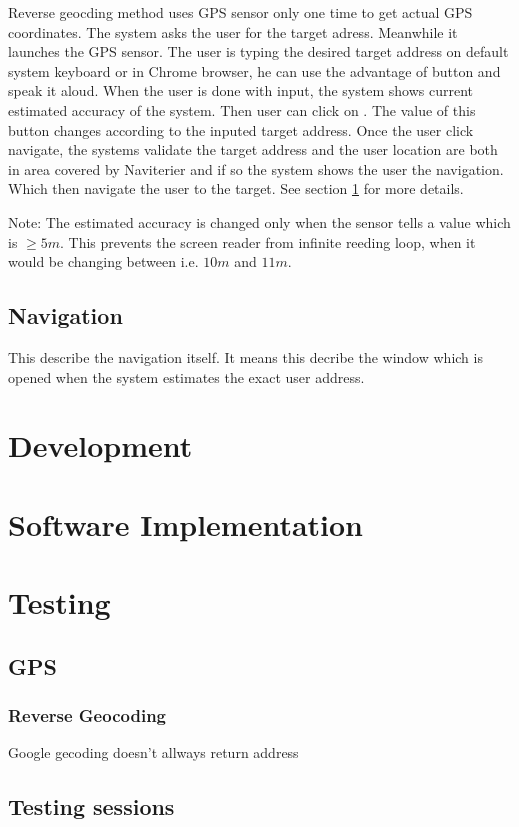 \documentclass[11pt,oneside,a4paper]{book}
\begin{document}
			Reverse geocding method uses GPS sensor only one time to get actual GPS coordinates. 
			The system asks the user for the target adress. Meanwhile it launches the GPS sensor.
			The user is typing the desired target address on default system keyboard or in Chrome browser, he can use the advantage of button  and speak it aloud.
			When the user is done with input, the system shows current estimated accuracy of the system.
			Then user can click on . The value of this button changes according to the inputed target address.
			Once the user click navigate, the systems validate the target address and the user location are both in area covered by Naviterier and if so the system shows the user the navigation. Which then navigate the user to the target. See section \ref{sec:navifation} for more details.
			
			Note: The estimated accuracy is changed only when the sensor tells a value which is $\geq 5m$. This prevents the screen reader from infinite reeding loop, when it would be changing between i.e. $10m$ and $11m$. 
		\section{Navigation}
		\label{sec:navifation}
		This describe the navigation itself. It means this decribe the window which is opened when the system estimates the exact user address.
	\chapter{Development}
	\chapter{Software Implementation}
	\chapter{Testing}
		\section{GPS}
			\subsection{Reverse Geocoding}
			Google gecoding doesn't allways return address
		
		\section{Testing sessions}
\end{document}

